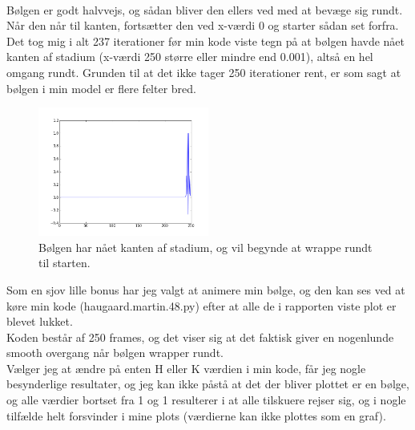 \documentclass[11pt]{article} %
\begin{document}
\\
Bølgen er godt halvvejs, og sådan bliver den ellers ved med at bevæge sig rundt. Når den når til kanten, fortsætter den ved x-værdi 0 og starter sådan set forfra.
\\
Det tog mig i alt 237 iterationer før min kode viste tegn på at bølgen havde nået kanten af stadium (x-værdi 250 større eller mindre end 0.001), altså en hel omgang rundt. Grunden til at det ikke tager 250 iterationer rent, er som sagt at bølgen i min model er flere felter bred.\\

\begin{figure}[h!]
\centering
   \includegraphics[width=0.5\textwidth]{slut}
  \caption{Bølgen har nået kanten af stadium, og vil begynde at wrappe rundt til starten.}
\end{figure}
Som en sjov lille bonus har jeg valgt at animere min bølge, og den kan ses ved at køre min kode (haugaard.martin.48.py) efter at alle de i rapporten viste plot er blevet lukket.\\
Koden består af 250 frames, og det viser sig at det faktisk giver en nogenlunde smooth overgang når bølgen wrapper rundt.\\
Vælger jeg at ændre på enten H eller K værdien i min kode, får jeg nogle besynderlige resultater, og jeg kan ikke påstå at det der bliver plottet er en bølge, og alle værdier bortset fra 1 og 1 resulterer i at alle tilskuere rejser sig, og i nogle tilfælde helt forsvinder i mine plots (værdierne kan ikke plottes som en graf).
\end{document}
